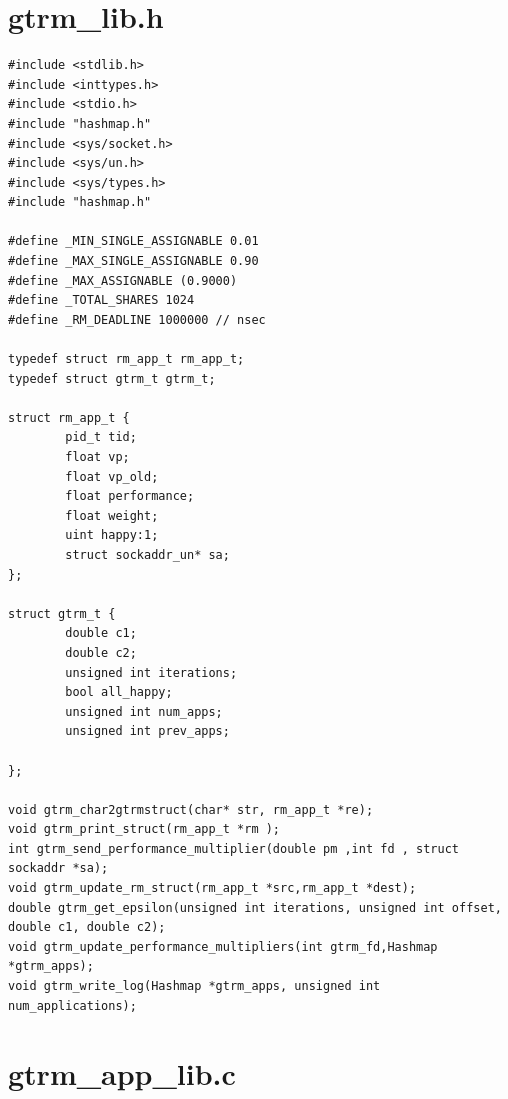 \documentclass[nobiblatex]{LTHthesis}
\begin{document}
\section{gtrm\_lib.h}
\begin{lstlisting}
#include <stdlib.h>
#include <inttypes.h>
#include <stdio.h>
#include "hashmap.h"
#include <sys/socket.h>
#include <sys/un.h>
#include <sys/types.h>    
#include "hashmap.h"   

#define _MIN_SINGLE_ASSIGNABLE 0.01
#define _MAX_SINGLE_ASSIGNABLE 0.90
#define _MAX_ASSIGNABLE (0.9000)
#define _TOTAL_SHARES 1024
#define _RM_DEADLINE 1000000 // nsec

typedef struct rm_app_t rm_app_t;
typedef struct gtrm_t gtrm_t;

struct rm_app_t {
		pid_t tid;
		float vp;
		float vp_old;
		float performance;
		float weight;
		uint happy:1;
		struct sockaddr_un* sa;
};

struct gtrm_t {
		double c1;
		double c2;
		unsigned int iterations;
		bool all_happy;
		unsigned int num_apps;
		unsigned int prev_apps;
		
};

void gtrm_char2gtrmstruct(char* str, rm_app_t *re);
void gtrm_print_struct(rm_app_t *rm );
int gtrm_send_performance_multiplier(double pm ,int fd , struct sockaddr *sa);
void gtrm_update_rm_struct(rm_app_t *src,rm_app_t *dest);
double gtrm_get_epsilon(unsigned int iterations, unsigned int offset, double c1, double c2);
void gtrm_update_performance_multipliers(int gtrm_fd,Hashmap *gtrm_apps);
void gtrm_write_log(Hashmap *gtrm_apps, unsigned int num_applications);
\end{lstlisting}

\section{gtrm\_app\_lib.c}
\end{document}
